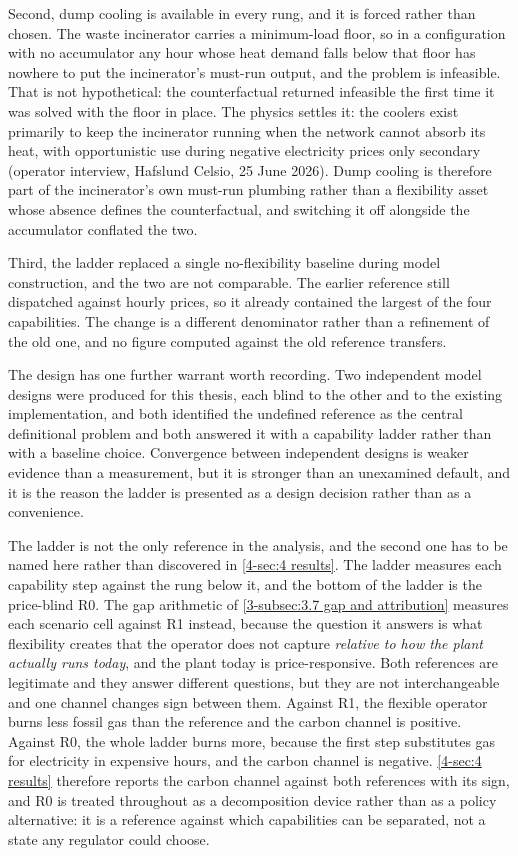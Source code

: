 Second, dump cooling is available in every rung, and it is forced rather than chosen. The waste incinerator carries a minimum-load floor, so in a configuration with no accumulator any hour whose heat demand falls below that floor has nowhere to put the incinerator's must-run output, and the problem is infeasible. That is not hypothetical: the counterfactual returned infeasible the first time it was solved with the floor in place. The physics settles it: the coolers exist primarily to keep the incinerator running when the network cannot absorb its heat, with opportunistic use during negative electricity prices only secondary (operator interview, Hafslund Celsio, 25 June 2026). Dump cooling is therefore part of the incinerator's own must-run plumbing rather than a flexibility asset whose absence defines the counterfactual, and switching it off alongside the accumulator conflated the two.

Third, the ladder replaced a single no-flexibility baseline during model construction, and the two are not comparable. The earlier reference still dispatched against hourly prices, so it already contained the largest of the four capabilities. The change is a different denominator rather than a refinement of the old one, and no figure computed against the old reference transfers.

The design has one further warrant worth recording. Two independent model designs were produced for this thesis, each blind to the other and to the existing implementation, and both identified the undefined reference as the central definitional problem and both answered it with a capability ladder rather than with a baseline choice. Convergence between independent designs is weaker evidence than a measurement, but it is stronger than an unexamined default, and it is the reason the ladder is presented as a design decision rather than as a convenience.

The ladder is not the only reference in the analysis, and the second one has to be named here rather than discovered in \autoref{4-sec:4 results}. The ladder measures each capability step against the rung below it, and the bottom of the ladder is the price-blind R0. The gap arithmetic of \autoref{3-subsec:3.7 gap and attribution} measures each scenario cell against R1 instead, because the question it answers is what flexibility creates that the operator does not capture \emph{relative to how the plant actually runs today}, and the plant today is price-responsive. Both references are legitimate and they answer different questions, but they are not interchangeable and one channel changes sign between them. Against R1, the flexible operator burns less fossil gas than the reference and the carbon channel is positive. Against R0, the whole ladder burns more, because the first step substitutes gas for electricity in expensive hours, and the carbon channel is negative. \autoref{4-sec:4 results} therefore reports the carbon channel against both references with its sign, and R0 is treated throughout as a decomposition device rather than as a policy alternative: it is a reference against which capabilities can be separated, not a state any regulator could choose.


